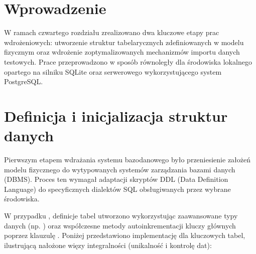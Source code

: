\documentclass[a4paper,11pt,english,openany,oneside]{sphinxmanual}
\begin{document}
\section{Wprowadzenie}
\label{\detokenize{rozdzial_4/index:wprowadzenie}}
\sphinxAtStartPar
W ramach czwartego rozdziału zrealizowano dwa kluczowe etapy prac wdrożeniowych: utworzenie struktur tabelarycznych zdefiniowanych w modelu fizycznym oraz wdrożenie zoptymalizowanych mechanizmów importu danych testowych. Prace przeprowadzono w sposób równoległy dla środowiska lokalnego opartego na silniku SQLite oraz serwerowego wykorzystującego system PostgreSQL.


\section{Definicja i inicjalizacja struktur danych}
\label{\detokenize{rozdzial_4/index:definicja-i-inicjalizacja-struktur-danych}}
\sphinxAtStartPar
Pierwszym etapem wdrażania systemu bazodanowego było przeniesienie założeń modelu fizycznego do wytypowanych systemów zarządzania bazami danych (DBMS). Proces ten wymagał adaptacji skryptów DDL (Data Definition Language) do specyficznych dialektów SQL obsługiwanych przez wybrane środowiska.

\sphinxAtStartPar
W przypadku , definicje tabel utworzono wykorzystując zaawansowane typy danych (np. ) oraz współczesne metody autoinkrementacji kluczy głównych poprzez klauzulę . Poniżej przedstawiono implementację dla kluczowych tabel, ilustrującą nałożone więzy integralności (unikalność i kontrolę dat):
\end{document}

